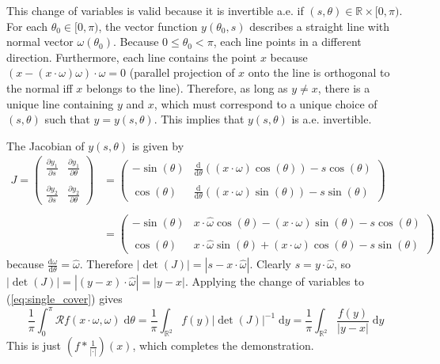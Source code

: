 \documentclass{homework}
\begin{document}
	This change of variables is valid because it is invertible a.e. if \((s, \theta)\in\mathbb{R}\times [0,\pi)\). For each \(\theta_0 \in [0, \pi)\), the vector function \(y(\theta_0, s)\) describes a straight line with normal vector \(\omega(\theta_0)\). Because \(0 \le \theta_0 <\pi\), each line points in a different direction. Furthermore, each line contains the point \(x\) because \((x - (x\cdot\omega)\omega)\cdot\omega=0\) (parallel projection of \(x\) onto the line is orthogonal to the normal iff \(x\) belongs to the line). Therefore, as long as  \(y \ne x\), there is a unique line containing \(y\) and \(x\), which must correspond to a unique choice of \((s, \theta)\) such that \(y = y(s, \theta)\). This implies that \(y(s, \theta)\) is a.e. invertible. 
	
	The Jacobian of \(y(s, \theta)\) is given by
	\begin{align*}
		J = \left(
		\begin{matrix}
			\frac{\partial y_1}{\partial s} & \frac{\partial y_1}{\partial \theta} \\ \\
			\frac{\partial y_2}{\partial s} & \frac{\partial y_2}{\partial \theta}
		\end{matrix}
		\right) &= 
		\left(
		\begin{matrix}
			-\sin(\theta) & \frac{\text{d}}{\text{d}\theta}((x\cdot\omega)\cos(\theta)) - s \cos(\theta) \\\\
			\cos(\theta) & \frac{\text{d}}{\text{d}\theta}((x\cdot\omega)\sin(\theta)) - s\sin(\theta)
		\end{matrix}
		\right) \\ \\
		&=
		\left(
		\begin{matrix}
			-\sin(\theta) & x\cdot\widehat{\omega}\cos(\theta) - (x\cdot\omega)\sin(\theta) - s \cos(\theta) \\\\
			\cos(\theta) & x\cdot\widehat{\omega}\sin(\theta) + (x\cdot\omega)\cos(\theta) - s\sin(\theta)
		\end{matrix}
		\right)
	\end{align*}
	because \(\frac{\text{d}\omega}{\text{d}\theta} = \widehat{\omega}\). Therefore \(\left|\det(J)\right| = \left|s -x\cdot\widehat{\omega}\right|\). Clearly \(s = y\cdot\widehat{\omega}\), so \(\left|\det(J)\right| = \left|\left(y - x\right)\cdot\widehat{\omega}\right| = \left|y - x\right|\). Applying the change of variables to (\ref{eq:single_cover}) gives
	\begin{equation*}
		\frac{1}{\pi}\int_0^{\pi}\mathcal{R}f(x\cdot \omega, \omega)\;\text{d}\theta = \frac{1}{\pi}\int_{\mathbb{R}^2} f(y)|\det(J)|^{-1}\;\text{d}y = \frac{1}{\pi}\int_{\mathbb{R}^2}\frac{f(y)}{\left|y-x\right|}\;\text{d}y
	\end{equation*}
	 This is just \(\left(f*\frac{1}{\left|\cdot\right|}\right)(x)\), which completes the demonstration.
	 
\end{document}
